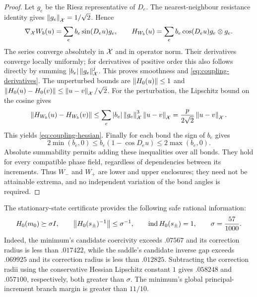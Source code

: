 \begin{proof}
Let $g_e$ be the Riesz representative of $D_e$. The nearest-neighbour
resistance identity gives $\left\lVert g_e\right\rVert_{\mathcal X}=1/\sqrt2$. Hence
\[
 \nabla_{\mathcal X}W_b(u)=\sum_e b_e\sin(D_eu)g_e,\qquad
 H_{W_b}(u)=\sum_e b_e\cos(D_eu)g_e\otimes g_e.
\]
The series converge absolutely in $\mathcal X$ and in operator norm. Their
derivatives converge locally uniformly; for derivatives of positive order
this also follows directly by summing $|b_e|\left\lVert g_e\right\rVert_{\mathcal X}^{j}$.
This proves smoothness and \eqref{eq:coupling-derivatives}. The unperturbed
bounds are $\left\lVert H_0(u)\right\rVert\le1$ and
$\left\lVert H_0(u)-H_0(v)\right\rVert\le\left\lVert u-v\right\rVert_{\mathcal X}/\sqrt2$. For the perturbation,
the Lipschitz bound on the cosine gives
\[
 \left\lVert H_{W_b}(u)-H_{W_b}(v)\right\rVert
 \le\sum_e|b_e|\left\lVert g_e\right\rVert_{\mathcal X}^3\left\lVert u-v\right\rVert_{\mathcal X}
 =\frac{p}{2\sqrt2}\left\lVert u-v\right\rVert_{\mathcal X}.
\]
This yields \eqref{eq:coupling-hessian}. Finally
for each bond the sign of $b_e$ gives
\[
 2\min(b_e,0)\le b_e(1-\cos D_eu)\le2\max(b_e,0).
\]
Absolute summability permits adding these inequalities over all bonds.
They hold for every compatible phase field, regardless of dependencies
between its increments. Thus $W_-$ and $W_+$ are lower and upper
enclosures; they need not be attainable extrema, and no independent
variation of the bond angles is required.
\end{proof}

The stationary-state certificate provides the following safe rational
information:
\begin{equation}
 \label{eq:robust-seed-gap}
 H_0(m_0)\succeq\sigma I,\qquad
 \left\lVert H_0(s_\pm)^{-1}\right\rVert\le\sigma^{-1},\qquad
 \operatorname{ind}H_0(s_\pm)=1,
 \qquad \sigma=\frac{57}{1000}.
\end{equation}
Indeed, the minimum's candidate coercivity exceeds $.07567$ and its
correction radius is less than $.017422$, while the saddle's candidate
inverse gap exceeds $.069925$ and its correction radius is less than
$.012825$. Subtracting the correction radii using the conservative
Hessian Lipschitz constant $1$ gives $.058248$ and $.057100$, respectively,
both greater than $\sigma$. The minimum's global principal-increment
branch margin is greater than $11/10$.

